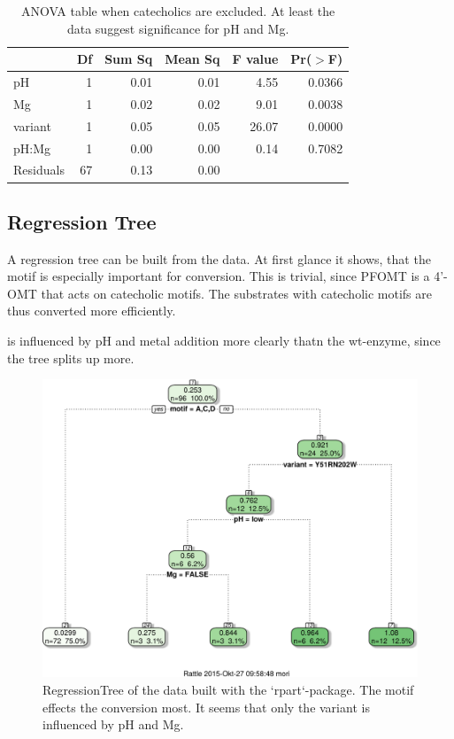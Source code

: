 \documentclass[]{tufte-handout}
\begin{document}
\begin{table}[ht]
\centering
\begin{tabular}{lrrrrr}
  \toprule
 & Df & Sum Sq & Mean Sq & F value & Pr($>$F) \\ 
  \midrule
pH          & 1 & 0.01 & 0.01 & 4.55 & 0.0366 \\ 
  Mg          & 1 & 0.02 & 0.02 & 9.01 & 0.0038 \\ 
  variant     & 1 & 0.05 & 0.05 & 26.07 & 0.0000 \\ 
  pH:Mg       & 1 & 0.00 & 0.00 & 0.14 & 0.7082 \\ 
  Residuals   & 67 & 0.13 & 0.00 &  &  \\ 
   \bottomrule
\end{tabular}
\caption{ANOVA table when catecholics are excluded. At least the data suggest significance for pH and Mg.} 
\end{table}

\subsection{Regression Tree}\label{regression-tree}

A regression tree can be built from the data. At first glance it shows,
that the motif is especially important for conversion. This is trivial,
since PFOMT is a 4'-OMT that acts on catecholic motifs. The substrates
with catecholic motifs are thus converted more efficiently.

 is influenced by pH and metal
addition more clearly thatn the wt-enzyme, since the tree splits up
more.

\begin{figure}
 \includegraphics{tufte_files/figure-latex/unnamed-chunk-7-1.pdf}
\caption{RegressionTree of the data built with the `rpart`-package. The motif effects the conversion most. It seems that only the variant is influenced by pH and Mg.}
\end{figure}
\end{document}
